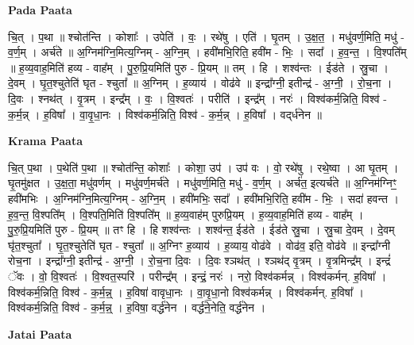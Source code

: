 \documentclass[17pt]{extarticle}
\begin{document}
\textbf{Pada Paata} \newline

चि॒त् । प॒था ॥ श्चोत॑न्ति । कोशाः᳚ । उपेति॑ । वः॒ । रथे॑षु । एति॑ । घृ॒तम् । उ॒क्ष॒त॒ । मधु॑वर्ण॒मिति॒ मधु॑ - व॒र्ण॒म् । अर्च॑ते ॥ अ॒ग्निम॑ग्नि॒मित्य॒ग्निम् - अ॒ग्नि॒म् । हवी॑मभि॒रिति॒ हवी॑म - भिः॒ । सदा᳚ । ह॒व॒न्त॒ । वि॒श्पति᳚म् ॥ ह॒व्य॒वाह॒मिति॑ हव्य - वाह᳚म् । पु॒रु॒प्रि॒यमिति॑ पुरु - प्रि॒यम् ॥ तम् । हि । शश्व॑न्तः । ईड॑ते । स्रु॒चा । दे॒वम् । घृ॒त॒श्चुतेति॑ घृत - श्चुता᳚ ॥ अ॒ग्निम् । ह॒व्याय॑ । वोढ॑वे ॥ इन्द्रा᳚ग्नी॒ इतीन्द्र॑ - अ॒ग्नी॒ । रो॒च॒ना । दि॒वः । श्नथ॑त् । वृ॒त्रम् । इन्द्र᳚म् । वः॒ । वि॒श्वतः॑ । परीति॑ । इन्द्र᳚म् । नरः॑ । विश्व॑कर्म॒न्निति॒ विश्व॑ - क॒र्म॒न्न् । ह॒विषा᳚ । वा॒वृ॒धा॒नः । विश्व॑कर्म॒न्निति॒ विश्व॑ - क॒र्म॒न्न् । ह॒विषा᳚ । वद्‌र्ध॑नेन ॥  \newline


\textbf{Krama Paata} \newline

चि॒त् प॒था । प॒थेति॑ प॒था ॥ श्चोत॑न्ति॒ कोशाः᳚ । कोशा॒ उप॑ । उप॑ वः । वो॒ रथे॑षु । रथे॒ष्वा । आ घृ॒तम् । घृ॒तमु॑क्षत । उ॒क्ष॒ता॒ मधु॑वर्णम् । मधु॑वर्ण॒मर्च॑ते । मधु॑वर्ण॒मिति॒ मधु॑ - व॒र्ण॒म् । अर्च॑त॒ इत्यर्च॑ते ॥ अ॒ग्निम॑ग्निꣳ॒॒ हवी॑मभिः । अ॒ग्निम॑ग्नि॒मित्य॒ग्निम् - अ॒ग्नि॒म् । हवी॑मभिः॒ सदा᳚ । हवी॑मभि॒रिति॒ हवी॑म - भिः॒ । सदा॑ हवन्त । ह॒व॒न्त॒ वि॒श्पति᳚म् । वि॒श्पति॒मिति॑ वि॒श्पति᳚म् ॥ ह॒व्य॒वाह॑म् पुरुप्रि॒यम् । ह॒व्य॒वाह॒मिति॑ हव्य - वाह᳚म् । पु॒रु॒प्रि॒यमिति॑ पुरु - प्रि॒यम् ॥ तꣳ हि । हि शश्व॑न्तः । शश्व॑न्त॒ ईड॑ते । ईड॑ते स्रु॒चा । स्रु॒चा दे॒वम् । दे॒वम् घृ॑त॒श्चुता᳚ । घृ॒त॒श्चुतेति॑ घृत - श्चुता᳚ ॥ अ॒ग्निꣳ ह॒व्याय॑ । ह॒व्याय॒ वोढ॑वे । वोढ॑व॒ इति॒ वोढ॑वे ॥ इन्द्रा᳚ग्नी रोच॒ना । इन्द्रा᳚ग्नी॒ इतीन्द्र॑ - अ॒ग्नी॒ । रो॒च॒ना दि॒वः । दि॒वः श्ञथ॑त् । श्ञथ॑द् वृ॒त्रम् । वृ॒त्रमिन्द्र᳚म् । इन्द्रं॑ ॅवः । वो॒ वि॒श्वतः॑ । वि॒श्वत॒स्परि॑ । परीन्द्र᳚म् । इन्द्रं॒ नरः॑ । नरो॒ विश्व॑कर्मन्न् । विश्व॑कर्मन्. ह॒विषा᳚ । विश्व॑कर्म॒न्निति॒ विश्व॑ - क॒र्म॒न्न्॒ । ह॒विषा॑ वावृधा॒नः । वा॒वृ॒धा॒नो विश्व॑कर्मन्न् । विश्व॑कर्मन्. ह॒विषा᳚ । विश्व॑कर्म॒न्निति॒ विश्व॑ - क॒र्म॒न्न्॒ । ह॒विषा॒ वर्द्ध॑नेन । वर्द्ध॑ने॒नेति॒ वर्द्ध॑नेन । \newline

\textbf{Jatai Paata} \newline
\end{document}
